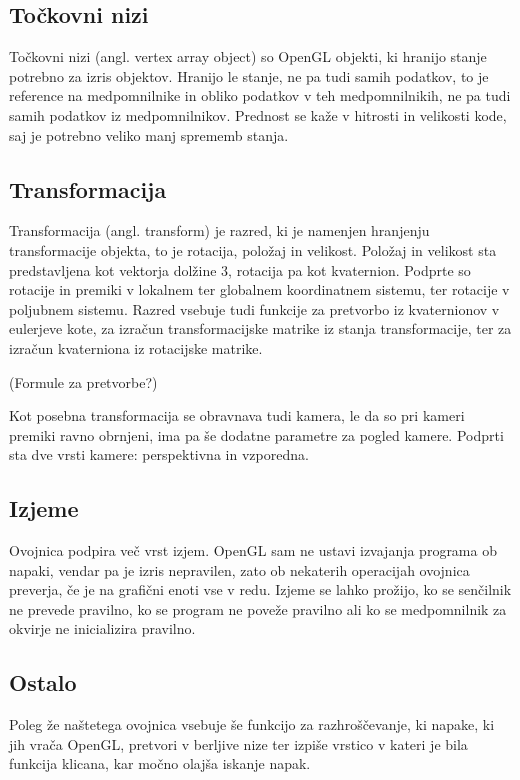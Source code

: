 \documentclass[a4paper, 12pt]{book}
\begin{document}
\subsection*{Točkovni nizi}

Točkovni nizi (angl. vertex array object) so OpenGL objekti, ki hranijo stanje potrebno za izris objektov. Hranijo le stanje, ne pa tudi samih podatkov, to je reference na medpomnilnike in obliko podatkov v teh medpomnilnikih, ne pa tudi samih podatkov iz medpomnilnikov. Prednost se kaže v hitrosti in velikosti kode, saj je potrebno veliko manj sprememb stanja.

\subsection*{Transformacija}

Transformacija (angl. transform) je razred, ki je namenjen hranjenju transformacije objekta, to je rotacija, položaj in velikost. Položaj in velikost sta predstavljena kot vektorja dolžine 3, rotacija pa kot kvaternion. Podprte so rotacije in premiki v lokalnem ter globalnem koordinatnem sistemu, ter rotacije v poljubnem sistemu. Razred vsebuje tudi funkcije za pretvorbo iz kvaternionov v eulerjeve kote, za izračun transformacijske matrike iz stanja transformacije, ter za izračun kvaterniona iz rotacijske matrike.

(Formule za pretvorbe?)

Kot posebna transformacija se obravnava tudi kamera, le da so pri kameri premiki ravno obrnjeni, ima pa še dodatne parametre za pogled kamere. Podprti sta dve vrsti kamere: perspektivna in vzporedna.
\subsection*{Izjeme}
Ovojnica podpira več vrst izjem. OpenGL sam ne ustavi izvajanja programa ob napaki, vendar pa je izris nepravilen, zato ob nekaterih operacijah ovojnica preverja, če je na grafični enoti vse v redu. Izjeme se lahko prožijo, ko se senčilnik ne prevede pravilno, ko se program ne poveže pravilno ali ko se medpomnilnik za okvirje ne inicializira pravilno.

\subsection*{Ostalo}

Poleg že naštetega ovojnica vsebuje še funkcijo za razhroščevanje, ki napake, ki jih vrača OpenGL, pretvori v berljive nize ter izpiše vrstico v kateri je bila funkcija klicana, kar močno olajša iskanje napak.
\end{document}
